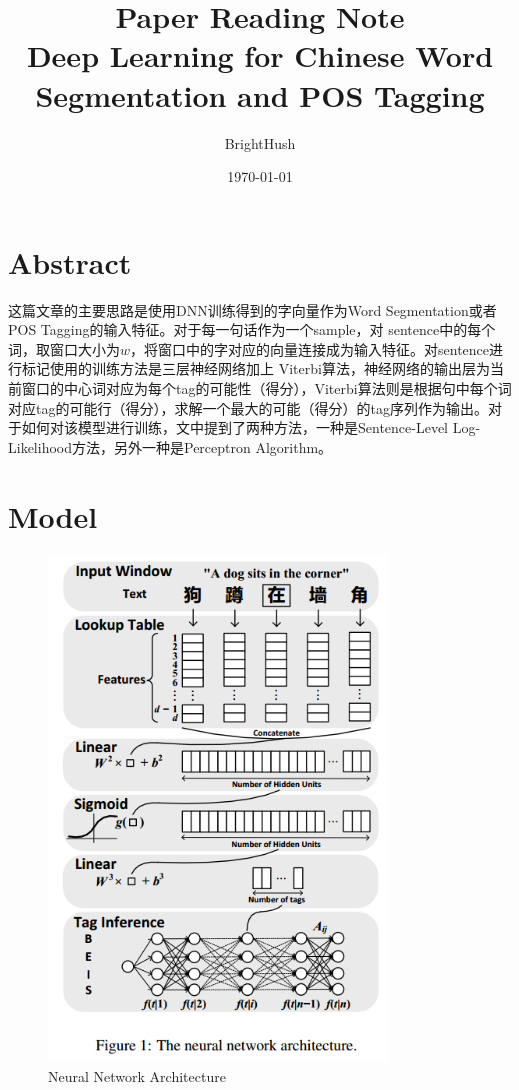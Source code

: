 \documentclass[UTF8]{ctexart}
\title{Paper Reading Note \\ Deep Learning for Chinese Word Segmentation and POS Tagging}
\author{BrightHush}
\date{\today}
\begin{document}
\maketitle
\tableofcontents

\newcommand{\figref}[1]{\figurename~\ref{#1}}

\section{Abstract}
这篇文章的主要思路是使用DNN训练得到的字向量作为Word Segmentation或者POS Tagging的输入特征。对于每一句话作为一个sample，对
sentence中的每个词，取窗口大小为$w$，将窗口中的字对应的向量连接成为输入特征。对sentence进行标记使用的训练方法是三层神经网络加上
Viterbi算法，神经网络的输出层为当前窗口的中心词对应为每个tag的可能性（得分），Viterbi算法则是根据句中每个词对应tag的可能行（得分），求解一个最大的可能（得分）的tag序列作为输出。对于如何对该模型进行训练，文中提到了两种方法，一种是Sentence-Level Log-Likelihood方法，另外一种是Perceptron Algorithm。

\section{Model}

\begin{figure}
\centering
\includegraphics[width=0.8\textwidth]{NeuralNetworkArchitecture}
\caption{Neural Network Architecture}
\label{Figure One}
\end{figure}
\end{document}
